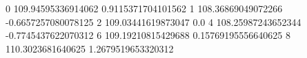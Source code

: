0 109.94595336914062 0.9115371704101562
1 108.36869049072266 -0.6657257080078125
2 109.03441619873047 0.0
4 108.25987243652344 -0.7745437622070312
6 109.19210815429688 0.15769195556640625
8 110.3023681640625 1.2679519653320312
